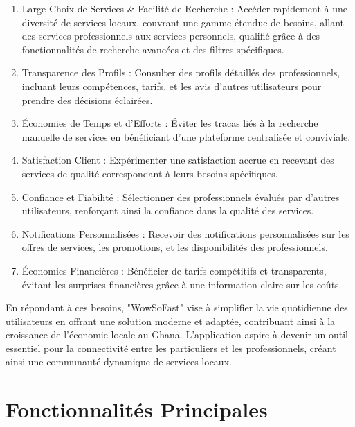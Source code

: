 {\begin{enumerate}
    \item Large Choix de Services \& Facilité de Recherche  : Accéder rapidement à une diversité de services locaux, couvrant une gamme étendue de besoins, allant des services professionnels aux services personnels, qualifié grâce à des fonctionnalités de recherche avancées et des filtres spécifiques.

    \item Transparence des Profils : Consulter des profils détaillés des professionnels, incluant leurs compétences, tarifs, et les avis d'autres utilisateurs pour prendre des décisions éclairées.

    \item Économies de Temps et d'Efforts : Éviter les tracas liés à la recherche manuelle de services en bénéficiant d'une plateforme centralisée et conviviale.

    \item Satisfaction Client : Expérimenter une satisfaction accrue en recevant des services de qualité correspondant à leurs besoins spécifiques.

    \item Confiance et Fiabilité : Sélectionner des professionnels évalués par d'autres utilisateurs, renforçant ainsi la confiance dans la qualité des services.

    \item Notifications Personnalisées : Recevoir des notifications personnalisées sur les offres de services, les promotions, et les disponibilités des professionnels.

    \item Économies Financières : Bénéficier de tarifs compétitifs et transparents, évitant les surprises financières grâce à une information claire sur les coûts.

\end{enumerate}

En répondant à ces besoins, "WowSoFast" vise à simplifier la vie quotidienne des utilisateurs en offrant une solution moderne et adaptée, contribuant ainsi à la croissance de l'économie locale au Ghana. L'application aspire à devenir un outil essentiel pour la connectivité entre les particuliers et les professionnels, créant ainsi une communauté dynamique de services locaux.

\section{Fonctionnalités Principales}

}
